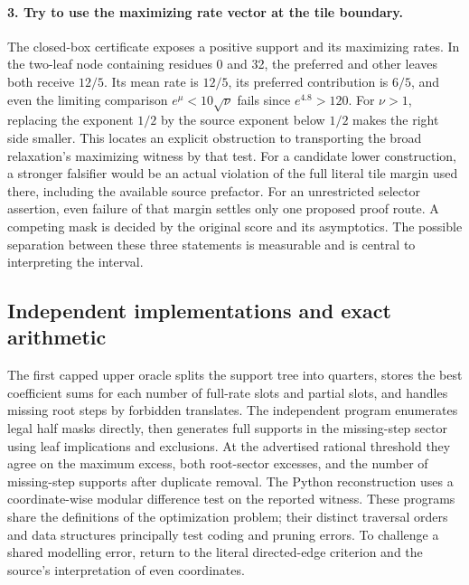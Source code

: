 \documentclass[12pt,letterpaper]{article}
\begin{document}
\paragraph{3. Try to use the maximizing rate vector at the tile boundary.}
The closed-box certificate exposes a positive support and its maximizing rates. In the two-leaf node containing residues 0 and 32, the preferred and other leaves both receive \(12/5\). Its mean rate is \(12/5\), its preferred contribution is \(6/5\), and even the limiting comparison \(e^{\mu}<10\sqrt{\nu}\) fails since \(e^{4.8}>120\). For \(\nu>1\), replacing the exponent \(1/2\) by the source exponent below \(1/2\) makes the right side smaller. This locates an explicit obstruction to transporting the broad relaxation's maximizing witness by that test. For a candidate lower construction, a stronger falsifier would be an actual violation of the full literal tile margin used there, including the available source prefactor. For an unrestricted selector assertion, even failure of that margin settles only one proposed proof route. A competing mask is decided by the original score and its asymptotics. The possible separation between these three statements is measurable and is central to interpreting the interval.

\subsection{Independent implementations and exact arithmetic}

The first capped upper oracle splits the support tree into quarters, stores the best coefficient sums for each number of full-rate slots and partial slots, and handles missing root steps by forbidden translates. The independent program enumerates legal half masks directly, then generates full supports in the missing-step sector using leaf implications and exclusions. At the advertised rational threshold they agree on the maximum excess, both root-sector excesses, and the number of missing-step supports after duplicate removal. The Python reconstruction uses a coordinate-wise modular difference test on the reported witness. These programs share the definitions of the optimization problem; their distinct traversal orders and data structures principally test coding and pruning errors. To challenge a shared modelling error, return to the literal directed-edge criterion and the source's interpretation of even coordinates.
\end{document}
